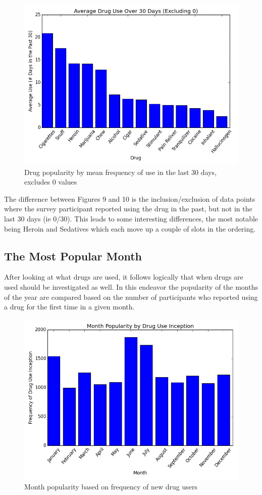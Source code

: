 \documentclass[a4 paper]{article}
\begin{document}
\begin{figure}[H]
	\centering
	\includegraphics[width=5in]{images/use30}
	\caption{Drug popularity by mean frequency of use in the last 30 days, excludes 0 values}
\end{figure}

The difference between Figures 9 and 10 is the inclusion/exclusion of data points where the survey participant reported using the drug in the past, but not in the last 30 days (ie 0/30). This leads to some interesting differences, the most notable being Heroin and Sedatives which each move up a couple of slots in the ordering.\\

\subsection*{The Most Popular Month}
After looking at what drugs are used, it follows logically that when drugs are used should be investigated as well. In this endeavor the popularity of the months of the year are compared based on the number of participants who reported using a drug for the first time in a given month.

\begin{figure}[H]
	\centering
	\includegraphics[width=5in]{images/months}
	\caption{Month popularity based on frequency of new drug users}
\end{figure}
\end{document}
